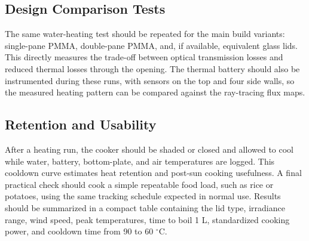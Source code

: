 \subsection{Design Comparison Tests}

The same water-heating test should be repeated for the main build variants: single-pane PMMA,
double-pane PMMA, and, if available, equivalent glass lids.  This directly measures the
trade-off between optical transmission losses and reduced thermal losses through the opening.
The thermal battery should also be instrumented during these runs, with sensors on the top and
four side walls, so the measured heating pattern can be compared against the ray-tracing flux
maps.

\subsection{Retention and Usability}

After a heating run, the cooker should be shaded or closed and allowed to cool while water,
battery, bottom-plate, and air temperatures are logged.  This cooldown curve estimates heat
retention and post-sun cooking usefulness.  A final practical check should cook a simple
repeatable food load, such as rice or potatoes, using the same tracking schedule expected in
normal use.  Results should be summarized in a compact table containing the lid type,
irradiance range, wind speed, peak temperatures, time to boil 1 L, standardized cooking power,
and cooldown time from 90 to 60 $^\circ$C.
